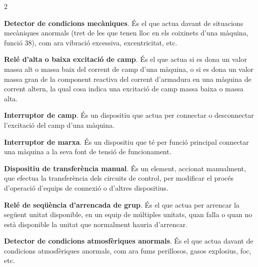 \begin{multicols}{2}
\begin{list}{}
		\item[\textbf{39}]  
		\textbf{Detector de condicions mecàniques}. És el que actua davant
		de situacions mecàniques anormals (tret de les que tenen lloc en els
		coixinets d'una màquina, funció 38), com ara vibració excessiva,
		excentricitat, etc.
		
		\item[\textbf{40}]  
		\textbf{Relé d'alta o baixa excitació de camp}. És el que actua si es dona un valor massa alt o massa baix del corrent de camp d'una màquina, o si es dona un valor
		massa gran de la component reactiva del corrent d'armadura en una màquina de corrent
		altern, la qual cosa indica una excitació de camp massa baixa o massa alta.
		
		\item[\textbf{41}]   
		\textbf{Interruptor de camp}. És un dispositiu
		que actua per connectar o desconnectar l'excitació del camp
		d'una màquina.
		
		\item[\textbf{42}]   
		\textbf{Interruptor de marxa}. És un
		dispositiu que té per funció principal connectar una màquina a la
		seva font de tensió de funcionament.
		
		\item[\textbf{43}]  
		\textbf{Dispositiu de transferència manual}. És
		un element, accionat manualment, que efectua la transferència dels circuits de control, per  modificar el procés d'operació d'equips de connexió o d'altres dispositius.
		
		\item[\textbf{44}]   
		\textbf{Relé de seqüència d'arrencada de grup}. És el que actua per arrencar la següent unitat
		disponible, en un equip de múltiples unitats, quan falla o quan no
		està disponible la unitat que normalment hauria d'arrencar.
		
		\item[\textbf{45}]   
		\textbf{Detector de condicions atmosfèriques anormals}. És el que actua davant de condicions atmosfèriques anormals, com ara fums
		perillosos, gasos explosius, foc, etc.
		

\end{list}
\end{multicols}
